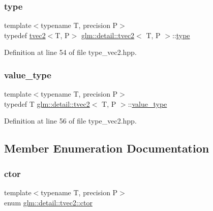 \subsubsection{\texorpdfstring{type}{type}}
{\footnotesize\ttfamily template$<$typename T, precision P$>$ \\
typedef \hyperlink{structglm_1_1detail_1_1tvec2}{tvec2}$<$T, P$>$ \hyperlink{structglm_1_1detail_1_1tvec2}{glm\+::detail\+::tvec2}$<$ T, P $>$\+::\hyperlink{structglm_1_1detail_1_1tvec2_a644c796a3f1da08b7481ca69fbd10818}{type}}



Definition at line 54 of file type\+\_\+vec2.\+hpp.

\mbox{\label{structglm_1_1detail_1_1tvec2_ab8ccd2ae98b414376608059114f5af41}} 
\subsubsection{\texorpdfstring{value\+\_\+type}{value\_type}}
{\footnotesize\ttfamily template$<$typename T, precision P$>$ \\
typedef T \hyperlink{structglm_1_1detail_1_1tvec2}{glm\+::detail\+::tvec2}$<$ T, P $>$\+::\hyperlink{structglm_1_1detail_1_1tvec2_ab8ccd2ae98b414376608059114f5af41}{value\+\_\+type}}



Definition at line 56 of file type\+\_\+vec2.\+hpp.



\subsection{Member Enumeration Documentation}
\mbox{\label{structglm_1_1detail_1_1tvec2_aa0bba0616f425fbd3fb5756aed326386}} 
\subsubsection{\texorpdfstring{ctor}{ctor}}
{\footnotesize\ttfamily template$<$typename T, precision P$>$ \\
enum \hyperlink{structglm_1_1detail_1_1tvec2_aa0bba0616f425fbd3fb5756aed326386}{glm\+::detail\+::tvec2\+::ctor}}

